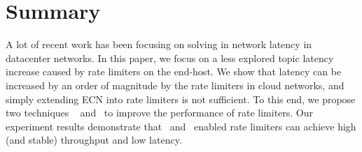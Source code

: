 \section{Summary} 
\label{rate-limiter:sec:conclusion} 

A lot of recent work has been focusing on solving in network latency in datacenter networks.
In this paper, we focus on a less explored topic \textemdash\xspace latency
increase caused by rate limiters on the end-host.
We show that latency can be increased by an order of magnitude
by the rate limiters in cloud networks,
and simply extending ECN into rate limiters is not sufficient.
To this end, we propose two techniques \textemdash\xspace~\dem{} and~\spring{} to improve the performance of rate limiters.
Our experiment results demonstrate that~\dem{} and~\spring{} enabled
rate limiters can achieve high (and stable) throughput and low latency.
